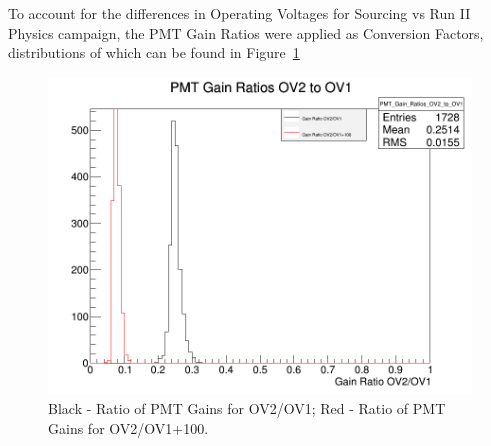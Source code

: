 To account for the differences in Operating Voltages for Sourcing vs Run II Physics campaign, the PMT Gain Ratios were applied as Conversion Factors, distributions of which can be found in Figure~\ref{fig:PMT_Gains}
\begin{figure}[!h]
	\begin{center}
		\includegraphics[width=.5\textwidth]{figures/ch_hfcalibration/GainRatios.png}
		\caption
		{Black - Ratio of PMT Gains for OV2/OV1; Red - Ratio of PMT Gains for OV2/OV1+100.
		}
		\label{fig:PMT_Gains}
	\end{center}
\end{figure}




